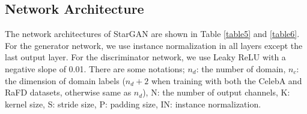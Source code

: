 \documentclass[10pt,twocolumn,letterpaper]{article}
\begin{document}
\medskip

\subsection{Network Architecture} \label{section7_2}
The network architectures of StarGAN are shown in Table \ref{table5} and \ref{table6}.  For the generator network, we use instance normalization in all layers except the last output layer. For the discriminator network, we use Leaky ReLU with a negative slope of 0.01. There are some notations; ${n}_{d}$: the number of domain, ${n}_{c}$: the dimension of domain labels (${n}_{d}+2$ when training with both the CelebA and RaFD datasets, otherwise same as ${n}_{d}$), N: the number of output channels, K: kernel size, S: stride size, P: padding size, IN: instance normalization.

\medskip
\end{document}
